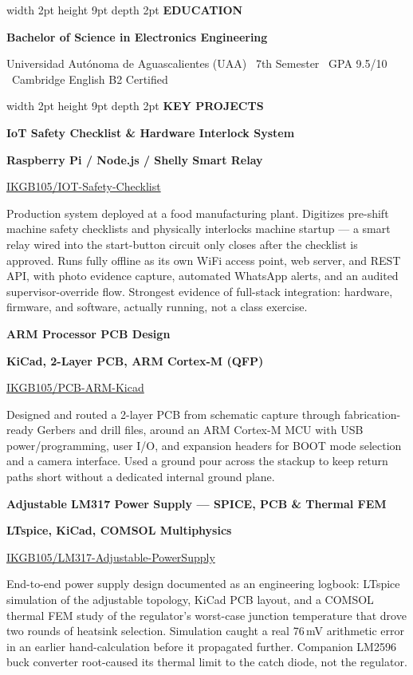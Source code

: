 \documentclass[10pt]{extarticle}
\newcommand{\cvsection}[1]{%
  \vspace{4pt}
  {\color{accent}\vrule width 2pt height 9pt depth 2pt}\hspace{5pt}%
  {\color{primary}\bfseries\fontsize{10.5}{10.5}\selectfont\MakeUppercase{#1}}%
  \vspace{4pt}\par\vspace{2pt}
}
\newcommand{\projtitle}[1]{{\color{primary}\bfseries\fontsize{10.5}{12}\selectfont #1}\par}
\newcommand{\projtech}[1]{{\color{accent}\bfseries\fontsize{9.5}{11}\selectfont #1}\par}
\newcommand{\projlink}[2]{{\color{secondary}\fontsize{9.5}{11}\selectfont \href{#1}{#2}}\par}
\newcommand{\projdesc}[1]{{\fontsize{9.5}{12}\selectfont #1}\par}
\begin{document}
\cvsection{Education}
{\color{primary}\bfseries\fontsize{10}{10}\selectfont Bachelor of Science in Electronics Engineering}\par
{\color{textlight}\fontsize{9}{9}\selectfont Universidad Autónoma de Aguascalientes (UAA) \textbullet\ 7th Semester \textbullet\ GPA 9.5/10 \textbullet\ Cambridge English B2 Certified}\par

\cvsection{Key Projects}

\projtitle{IoT Safety Checklist \& Hardware Interlock System}
\projtech{Raspberry Pi / Node.js / Shelly Smart Relay}
\projlink{https://github.com/IKGB105/IOT-Safety-Checklist}{IKGB105/IOT-Safety-Checklist}
\projdesc{Production system deployed at a food manufacturing plant. Digitizes pre-shift machine safety checklists and physically interlocks machine startup — a smart relay wired into the start-button circuit only closes after the checklist is approved. Runs fully offline as its own WiFi access point, web server, and REST API, with photo evidence capture, automated WhatsApp alerts, and an audited supervisor-override flow. Strongest evidence of full-stack integration: hardware, firmware, and software, actually running, not a class exercise.}
\vspace{1.5pt}

\projtitle{ARM Processor PCB Design}
\projtech{KiCad, 2-Layer PCB, ARM Cortex-M (QFP)}
\projlink{https://github.com/IKGB105/PCB-ARM-Kicad}{IKGB105/PCB-ARM-Kicad}
\projdesc{Designed and routed a 2-layer PCB from schematic capture through fabrication-ready Gerbers and drill files, around an ARM Cortex-M MCU with USB power/programming, user I/O, and expansion headers for BOOT mode selection and a camera interface. Used a ground pour across the stackup to keep return paths short without a dedicated internal ground plane.}
\vspace{1.5pt}

\projtitle{Adjustable LM317 Power Supply — SPICE, PCB \& Thermal FEM}
\projtech{LTspice, KiCad, COMSOL Multiphysics}
\projlink{https://github.com/IKGB105/LM317-Adjustable-PowerSupply}{IKGB105/LM317-Adjustable-PowerSupply}
\projdesc{End-to-end power supply design documented as an engineering logbook: LTspice simulation of the adjustable topology, KiCad PCB layout, and a COMSOL thermal FEM study of the regulator's worst-case junction temperature that drove two rounds of heatsink selection. Simulation caught a real 76\,mV arithmetic error in an earlier hand-calculation before it propagated further. Companion LM2596 buck converter root-caused its thermal limit to the catch diode, not the regulator.}
\vspace{1.5pt}
\end{document}
